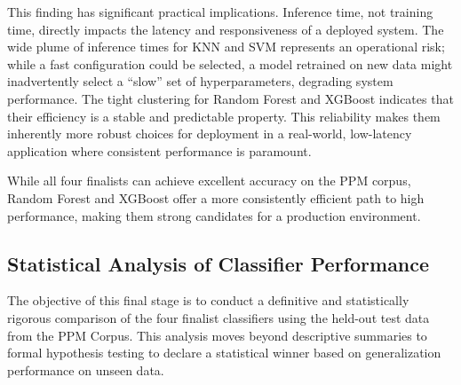 This finding has significant practical implications. Inference time, not training time, directly impacts the latency and responsiveness of a deployed system. The wide plume of inference times for KNN and SVM represents an operational risk; while a fast configuration could be selected, a model retrained on new data might inadvertently select a ``slow'' set of hyperparameters, degrading system performance. The tight clustering for Random Forest and XGBoost indicates that their efficiency is a stable and predictable property. This reliability makes them inherently more robust choices for deployment in a real-world, low-latency application where consistent performance is paramount.

While all four finalists can achieve excellent accuracy on the PPM corpus, Random Forest and XGBoost offer a more consistently efficient path to high performance, making them strong candidates for a production environment.

\subsection{Statistical Analysis of Classifier Performance}
The objective of this final stage is to conduct a definitive and statistically rigorous comparison of the four finalist classifiers using the held-out test data from the PPM Corpus. This analysis moves beyond descriptive summaries to formal hypothesis testing to declare a statistical winner based on generalization performance on unseen data.

